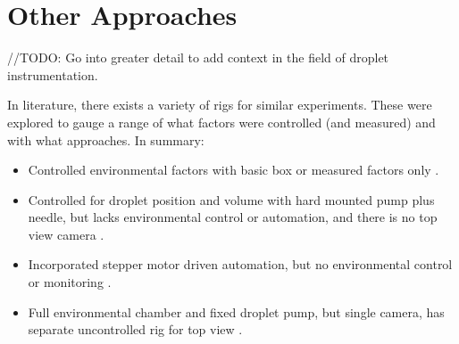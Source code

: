 \section{Other Approaches}
//TODO: Go into greater detail to add context in the field of droplet instrumentation.

In literature, there exists a variety of rigs for similar experiments. These were explored to gauge a range of what factors were controlled (and measured) and with what approaches. In summary:
\begin{itemize}
    \item Controlled environmental factors with basic box \cite{step_book} or measured factors only \cite{measure_only}.
    \item Controlled for droplet position and volume with hard mounted pump plus needle, but lacks environmental control or automation, and there is no top view camera \cite{non_newt} \cite{fixed_pump}.
    \item Incorporated stepper motor driven automation, but no environmental control or monitoring \cite{motors}.
    \item Full environmental chamber and fixed droplet pump, but single camera, has separate uncontrolled rig for top view \cite{duel_rig}.
\end{itemize}
